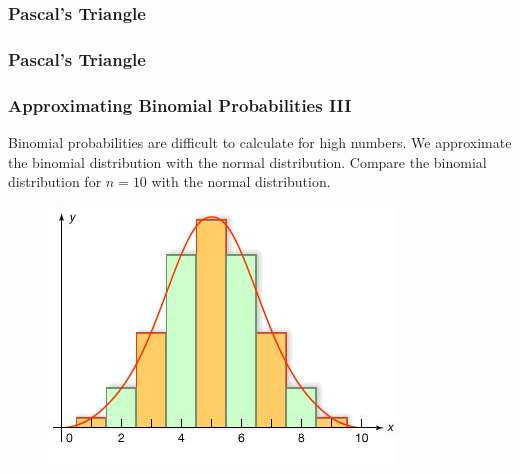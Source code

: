 \documentclass[xcolor=dvipsnames]{beamer}
\begin{document}
\begin{frame}
  \frametitle{Pascal's Triangle}
\end{frame}

\begin{frame}
  \frametitle{Pascal's Triangle}
\end{frame}

\begin{frame}
  \frametitle{Approximating Binomial Probabilities III}
Binomial probabilities are difficult to calculate for high numbers. We
approximate the binomial distribution with the \alert{normal distribution}.
Compare the binomial distribution for $n=10$ with the normal
distribution.
  \begin{figure}[h]
    \includegraphics[scale=.5]{./diagrams/binnorm1_ed.jpg}
  \end{figure}
\end{frame}
\end{document}
